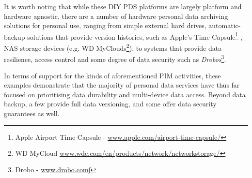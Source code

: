 \documentclass[graybox]{svmult}
\begin{document}
It is worth noting that while these DIY PDS platforms are largely platform and hardware agnostic, there are a number of hardware personal data archiving solutions for personal use, ranging from simple external hard drives, automatic-backup solutions that provide version histories, such as Apple’s Time Capsule\footnote{Apple Airport Time Capsule - \url{www.apple.com/airport-time-capsule/}} , NAS storage devices (e.g. WD MyClouds\footnote{WD MyCloud \url{www.wdc.com/en/products/network/networkstorage/}}), to systems that provide data resilience, access control and some degree of data security such as  \emph{Drobos}\footnote{Drobo - \url{www.drobo.com∫}}.  




In terms of support for the kinds of aforementioned PIM activities, these examples demonstrate that the majority of personal data services have thus far focused on prioritising data durability and multi-device data access.  Beyond data backup, a few provide full data versioning, and some offer data security guarantees as well. 
\end{document}
